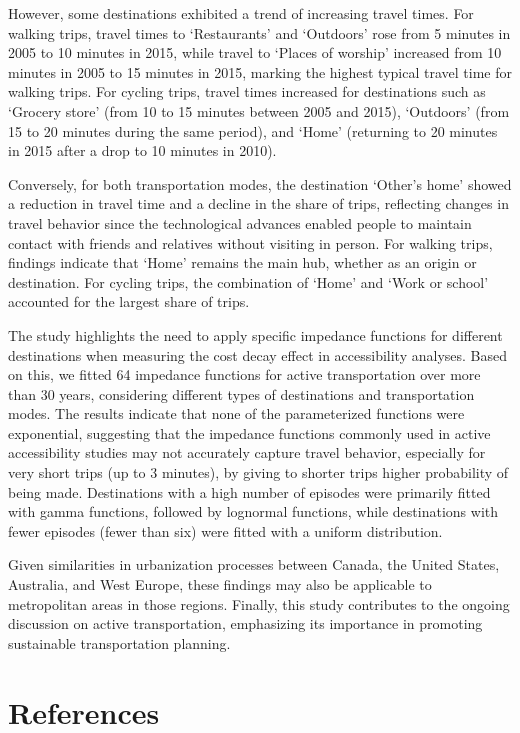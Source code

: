 \documentclass[preprint, 3p,
authoryear]{elsarticle} %
\begin{document}
However, some destinations exhibited a trend of increasing travel times.
For walking trips, travel times to `Restaurants' and `Outdoors' rose
from 5 minutes in 2005 to 10 minutes in 2015, while travel to `Places of
worship' increased from 10 minutes in 2005 to 15 minutes in 2015,
marking the highest typical travel time for walking trips. For cycling
trips, travel times increased for destinations such as `Grocery store'
(from 10 to 15 minutes between 2005 and 2015), `Outdoors' (from 15 to 20
minutes during the same period), and `Home' (returning to 20 minutes in
2015 after a drop to 10 minutes in 2010).

Conversely, for both transportation modes, the destination `Other's
home' showed a reduction in travel time and a decline in the share of
trips, reflecting changes in travel behavior since the technological
advances enabled people to maintain contact with friends and relatives
without visiting in person. For walking trips, findings indicate that
`Home' remains the main hub, whether as an origin or destination. For
cycling trips, the combination of `Home' and `Work or school' accounted
for the largest share of trips.

The study highlights the need to apply specific impedance functions for
different destinations when measuring the cost decay effect in
accessibility analyses. Based on this, we fitted 64 impedance functions
for active transportation over more than 30 years, considering different
types of destinations and transportation modes. The results indicate
that none of the parameterized functions were exponential, suggesting
that the impedance functions commonly used in active accessibility
studies may not accurately capture travel behavior, especially for very
short trips (up to 3 minutes), by giving to shorter trips higher
probability of being made. Destinations with a high number of episodes
were primarily fitted with gamma functions, followed by lognormal
functions, while destinations with fewer episodes (fewer than six) were
fitted with a uniform distribution.

Given similarities in urbanization processes between Canada, the United
States, Australia, and West Europe, these findings may also be
applicable to metropolitan areas in those regions. Finally, this study
contributes to the ongoing discussion on active transportation,
emphasizing its importance in promoting sustainable transportation
planning.

\hypertarget{references}{%
\section*{References}\label{references}}
\end{document}
